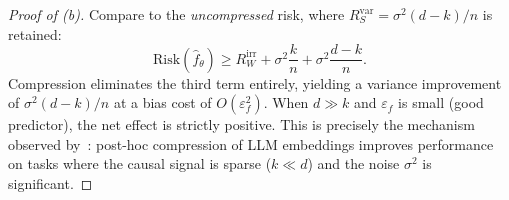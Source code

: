 \documentclass[11pt,a4paper]{article}
\theoremstyle{plain}
\theoremstyle{definition}
\theoremstyle{remark}
\begin{document}
\begin{proof}[Proof of (b)]
Compare to the \emph{uncompressed} risk, where $R^{\mathrm{var}}_S =
\sigma^2(d-k)/n$ is retained:
\begin{equation}\label{eq:uncompressed-risk}
  \mathrm{Risk}(\hat{f}_\theta)
  \geq R^{\mathrm{irr}}_W + \sigma^2\frac{k}{n}
  + \sigma^2\frac{d-k}{n}.
\end{equation}
Compression eliminates the third term entirely, yielding a variance improvement
of $\sigma^2(d-k)/n$ at a bias cost of $O(\varepsilon_f^2)$.  When $d \gg k$
and $\varepsilon_f$ is small (good predictor), the net effect is strictly
positive.  This is precisely the mechanism observed
by~\citet{drinkall2025dimensionality}: post-hoc compression of LLM embeddings
improves performance on tasks where the causal signal is sparse ($k \ll d$) and
the noise $\sigma^2$ is significant.
\end{proof}
\end{document}
